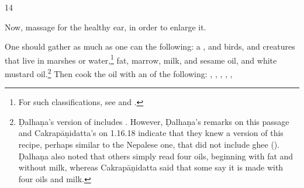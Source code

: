 \begin{translation}
\item [14]
    
Now, massage for the healthy ear, in order to enlarge it.
     
One should gather as much as one can the following: a ,
 and  birds, and creatures that
live in marshes or water,\footnote{For such classifications, see \citet{zimm-1999}
    and \citet{smit-1994}.} fat, marrow, milk, and sesame oil, and white mustard
    oil.\footnote{Ḍalhaṇa's version of  includes .
        However, Ḍalhaṇa's remarks on this passage and Cakrapāṇidatta's on 1.16.18
        \citep[130]{acar-1939} indicate that they knew a version of this recipe, perhaps
        similar to the Nepalese one, that did not include ghee (). Ḍalhaṇa also noted that
        others simply read four oils, beginning with fat and without milk, whereas
        Cakrapāṇidatta said that some say it is made with four oils and milk.} Then cook the oil with an
         of the following: ,
        , %
        , %
        , %
        , %

\end{translation}
